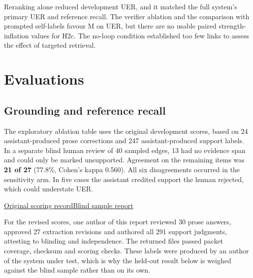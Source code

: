 \documentclass[11pt,a4paper]{article}
\newcommand{\runninglabel}{}
\newcommand{\reportpage}[1]{\newpage\renewcommand{\runninglabel}{#1}}
\newcommand{\evidencelinks}[2]{%
  \par\nopagebreak\vspace{1pt}%
  {\sffamily\fontsize{9.5}{13}\selectfont
   #1\quad\textcolor{Rule}{\textbar}\quad#2\par}%
}
\begin{document}
Reranking alone reduced development UER, and it matched the full
system's primary UER and reference recall. The verifier ablation and the
comparison with prompted self-labels favour M on UER, but there are no
usable paired strength-inflation values for H2c. The no-loop condition
established too few links to assess the effect of targeted retrieval.

\reportpage{Evaluation: Grounding}

\section{Evaluations}\label{evaluations}

\subsection{Grounding and reference
recall}\label{grounding-and-reference-recall}

The exploratory ablation table uses the original development scores,
based on 24 assistant-produced prose corrections and 247 assistant-produced
support labels. In a separate blind human review of 40 sampled edges,
13 had no evidence span and could only be marked unsupported. Agreement
on the remaining items was \textbf{21 of 27} (77.8\%, Cohen's kappa 0.560).
All six disagreements occurred in the sensitivity arm. In five cases
the assistant credited support the human rejected, which could understate UER.
\evidencelinks
  {\href{https://github.com/DeeptiKoranga/lma-grounding-decay/blob/b/episode-confirmation/reports/assistant_dev_support_review_20261110.md}{Original scoring record}}
  {\href{https://github.com/DeeptiKoranga/lma-grounding-decay/blob/b/episode-confirmation/reports/support_sample_validation.md}{Blind sample report}}

For the revised scores, one author of this report reviewed 30 prose answers,
approved 27 extraction revisions and authored all 291 support judgments,
attesting to blinding and independence. The returned files passed packet
coverage, checksum and scoring checks. These labels were produced by an author
of the system under test, which is why the held-out result below is weighed
against the blind sample rather than on its own.
\end{document}
